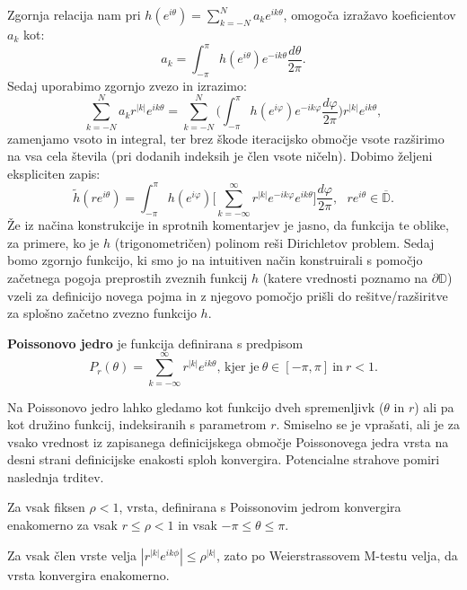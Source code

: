 \documentclass[mat1]{fmfdelo}
\begin{document}
        Zgornja relacija nam pri $h(e^{i\theta}) = \sum_{k = -N}^{N}{a_k e^{ik\theta}}$, omogoča izražavo koeficientov $a_k$ kot:
        $$
            a_ k = \int_{-\pi}^{\pi}{h(e^{i\theta}) e^{-ik\theta}\frac{d\theta}{2\pi}}.
        $$
    Sedaj uporabimo zgornjo zvezo in izrazimo:
    $$
        \sum_{k = - N}^{N}{ a_k r^{|k|}e^{ik\theta}} = \sum_{k = - N}^{N} \bigg(\int_{-\pi}^{\pi}{h(e^{i \varphi}) e^{- i k \varphi} \frac{d \varphi}{2 \pi}}\bigg) r^{|k|} e^{i k \theta},
    $$
    zamenjamo vsoto in integral, ter brez škode iteracijsko območje vsote razširimo na vsa cela števila (pri dodanih indeksih je člen vsote ničeln). Dobimo željeni ekspliciten zapis:
    \begin{equation}
        \label{int1}
        \tag{P}
        \widetilde{h}(r e^{i \theta}) = \int_{-\pi}^{\pi}{h(e^{i \varphi}) \bigg[\sum_{k = - \infty}^{\infty} r^{|k|} e^{- i k \varphi} e^{i k \theta}} \bigg]\frac{d \varphi}{2 \pi}, ~~~ r e^{i\theta} \in \overline{\mathbb{D}}.
    \end{equation}
    Že iz načina konstrukcije in sprotnih komentarjev je jasno, da funkcija te oblike, za primere, ko je $h$ (trigonometričen) polinom reši Dirichletov problem.
    Sedaj bomo zgornjo funkcijo, ki smo jo na intuitiven način konstruirali s pomočjo začetnega pogoja preprostih zveznih funkcij $h$ (katere vrednosti poznamo na $\partial \mathbb{D}$) vzeli za definicijo novega pojma in z njegovo pomočjo prišli do rešitve/razširitve za splošno začetno zvezno funkcijo $h$.
    \begin{definicija}
        \textbf{Poissonovo jedro} je funkcija definirana s predpisom
        $$
           P_r(\theta) = \sum_{k = -\infty}^{\infty}{r^{|k|} e^{i k \theta}}\text{, kjer je}~\theta \in [-\pi, \pi]~\text{in}~ r < 1.
        $$
    \end{definicija}
    Na Poissonovo jedro lahko gledamo kot funkcijo dveh spremenljivk ($\theta$ in $r$) ali pa kot družino funkcij, indeksiranih s parametrom $r$.
    \newline
    Smiselno se je vprašati, ali je za vsako vrednost iz zapisanega definicijskega območje Poissonovega jedra vrsta na desni strani definicijske enakosti sploh konvergira. Potencialne strahove pomiri naslednja trditev.
    \begin{trditev}
        Za vsak fiksen $\rho < 1$, vrsta, definirana s Poissonovim jedrom konvergira enakomerno za vsak $r\leq \rho < 1$ in vsak $ -\pi \leq \theta \leq \pi$.
    \end{trditev}
    \begin{dokaz}
        Za vsak člen vrste velja $|r^{|k|} e^{i k \phi}| \leq \rho^{|k|}$, zato po Weierstrassovem M-testu velja, da vrsta konvergira enakomerno.
    \end{dokaz}
\end{document}
